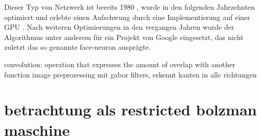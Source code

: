 Dieser Typ von Netzwerk ist bereits 1980 , wurde in den folgenden Jahrzehnten optimiert und erlebte einen Aufschwung durch eine Implementierung auf einer GPU . Nach weiteren Optimierungen in den vergangen Jahren wurde der Algorithmus unter anderem für ein Projekt von Google  eingesetzt, das nicht zuletzt das so genannte face-neuron ausprägte.

convolution: operation that expresses the amount of overlap with another function
image preprozessing mit gabor filters, erkennt kanten in alle richtungen



\section{betrachtung als restricted bolzman maschine}


